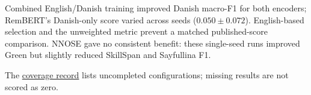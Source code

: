 \FloatBarrier

Combined English/Danish training improved Danish macro-F1 for both encoders; RemBERT's Danish-only score varied across seeds ($0.050\pm0.072$). English-based selection and the unweighted metric prevent a matched published-score comparison. NNOSE gave no consistent benefit: these single-seed runs improved Green but slightly reduced SkillSpan and Sayfullina F1.

The \href{https://github.com/AlfredJamesLi/chinese-skillspan-benchmark/blob/1d1c24e20ee049fc768034b5baf58fa882e08e2c/reproduction/process_archive_20260924/secondary_review/source/tex/external_benchmarks/paper_A_native.tex}{coverage record} lists uncompleted configurations; missing results are not scored as zero.
